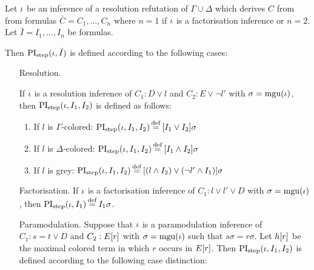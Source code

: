 \begin{defi}[$\PIstep$]
	Let $\iota$ be an inference of a resolution refutation of $\Gamma\cup\Delta$ which derives $C$ from from formulas $\bar C = C_1, \dots, C_n$ where $n=1$  if $\iota$ is a factorisation inference or $n=2$. 
	Let $\bar I = I_1, \dots, I_n$ be formulas.

	Then $\operatorname{PI}_{\mathrm{step}}(\iota, \bar I)$ is defined according to the following cases:

	\begin{itemize}
		\item[Resolution.]
			\label{def:PI_resolution}

			If $\iota$ is a resolution inference of $C_1: D \lor l$ and $C_2: E \lor \lnot l'$ with $\sigma = \operatorname{mgu}(\iota)$, then $\operatorname{PI}_{\mathrm{step}}(\iota, I_1, I_2)$ is defined as follows:
			\begin{enumerate}
				\item If $l$ is $\Gamma$-colored: $\PIstep(\inference, I_1, I_2) \defeq{} [I_1 \lor I_2]\sigma$
				\item If $l$ is $\Delta$-colored: $\PIstep(\inference, I_1, I_2) \defeq{} [I_1 \land I_2]\sigma$
				\item If $l$ is grey: $\PIstep(\inference, I_1, I_2) \defeq{} [(l \land I_2) \lor (\lnot l' \land I_1) ]\sigma $
			\end{enumerate}

		\item[Factorisation.]
			If $\iota$ is a factorisation inference of $C_1: l \lor l' \lor D$ with $\sigma = \operatorname{mgu}(\iota)$,
			then $\PIstep(\inference, I_1) \defeq I_1\sigma$.

		\item[Paramodulation.]
			\label{def:PI_paramod}
			Suppose that $\iota$ is a paramodulation inference of $C_1: s=t \lor D$ and $C_2: E[r]$ 
			with $\sigma = \operatorname{mgu}(\iota)$ such that $s\sigma = r\sigma$.
			Let $h[r]$ be the maximal colored term in which $r$ occurs in $E[r]$.
			Then $\operatorname{PI}_{\mathrm{step}}(\iota, I_1, I_2)$ is defined according to the following case distinction:


\end{itemize}
\end{defi}
